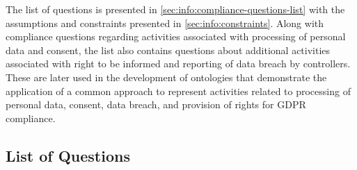 The list of questions is presented in \autoref{sec:info:compliance-questions-list} with the assumptions and constraints presented in \autoref{sec:info:constraints}. Along with compliance questions regarding activities associated with processing of personal data and consent, the list also contains questions about additional activities associated with right to be informed and reporting of data breach by controllers. These are later used in the development of ontologies that demonstrate the application of a common approach to represent activities related to processing of personal data, consent, data breach, and provision of rights for GDPR compliance. 

\subsection{List of Questions}\label{sec:info:compliance-questions-list}
